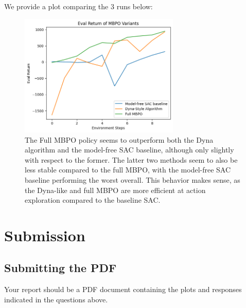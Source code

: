 \documentclass{article} %
\begin{document}
\begin{sol}
  We provide a plot comparing the 3 runs below:
  \begin{figure}[ht!]
    \color{darkblue}
    \begin{center}
      \includegraphics[width=3in]{images/q6/mbpo.png}
    \end{center}
    \caption{The Full MBPO policy seems to outperform both the Dyna algorithm and the model-free SAC baseline, although only slightly with respect to the former. 
    The latter two methods seem to also be less stable compared to the full MBPO, with the model-free SAC baseline performing the worst overall. This behavior makes sense, as the Dyna-like and full MBPO are more efficient at action exploration compared to the baseline SAC.}
  \end{figure}
\end{sol}

\newpage
\section*{Submission}

\subsection{Submitting the PDF}
Your report should be a PDF document containing the plots and responses indicated in the questions above.
\end{document}

